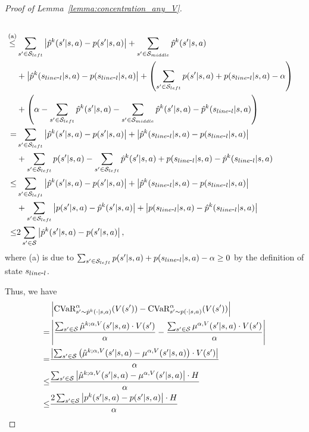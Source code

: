 \begin{proof}[Proof of Lemma~\ref{lemma:concentration_any_V}]
\begin{align}
		\nonumber\\
		\overset{\textup{(a)}}{\leq} & \sum_{s' \in \mathcal{S}_{left}} \left| \hat{p}^k(s'|s,a)-p(s'|s,a) \right| + \sum_{s' \in \mathcal{S}_{middle}} \hat{p}^{k}(s'|s,a) \nonumber\\& + \left| \hat{p}^{k}(s_{line \mbox{-} l}|s,a) - p(s_{line \mbox{-} l}|s,a) \right| + \left( \sum_{s' \in \mathcal{S}_{left}} p(s'|s,a) + p(s_{line \mbox{-} l}|s,a) - \alpha \right) \nonumber\\& + \left( \alpha-\sum_{s' \in \mathcal{S}_{left}} \hat{p}^{k}(s'|s,a) - \sum_{s' \in \mathcal{S}_{middle}} \hat{p}^{k}(s'|s,a) - \hat{p}^{k}(s_{line \mbox{-} l}|s,a) \right)
		\nonumber\\
		= & \sum_{s' \in \mathcal{S}_{left}} \left| \hat{p}^k(s'|s,a)-p(s'|s,a) \right| + \left| \hat{p}^{k}(s_{line \mbox{-} l}|s,a) - p(s_{line \mbox{-} l}|s,a) \right| \nonumber\\& + \sum_{s' \in \mathcal{S}_{left}} p(s'|s,a) - \sum_{s' \in \mathcal{S}_{left}} \hat{p}^{k}(s'|s,a) + p(s_{line \mbox{-} l}|s,a) - \hat{p}^{k}(s_{line \mbox{-} l}|s,a)
		\nonumber\\
		\leq & \sum_{s' \in \mathcal{S}_{left}} \left| \hat{p}^k(s'|s,a)-p(s'|s,a) \right| + \left| \hat{p}^{k}(s_{line \mbox{-} l}|s,a) - p(s_{line \mbox{-} l}|s,a) \right| \nonumber\\& + \sum_{s' \in \mathcal{S}_{left}} \left| p(s'|s,a) - \hat{p}^{k}(s'|s,a) \right| + \left| p(s_{line \mbox{-} l}|s,a) - \hat{p}^{k}(s_{line \mbox{-} l}|s,a) \right|
		\nonumber\\
		\leq & 2 \sum_{s' \in \mathcal{S}} \left| \hat{p}^k(s'|s,a)-p(s'|s,a) \right| , \label{eq:bound_mu_by_2p}
	\end{align}
	where (a) is due to $\sum_{s' \in \mathcal{S}_{left}} p(s'|s,a) + p(s_{line \mbox{-} l}|s,a) - \alpha \geq 0$ by the definition of state $s_{line \mbox{-} l}$.
	
	Thus, we have
	\begin{align}
		& \left| \textup{CVaR}^{\alpha}_{s' \sim \hat{p}^k(\cdot|s,a)}(V(s')) - \textup{CVaR}^{\alpha}_{s' \sim p(\cdot|s,a)}(V(s'))  \right|
		\nonumber\\
		= & \left| \frac{ \sum_{s' \in \mathcal{S}} \hat{\mu}^{k;\alpha,V}(s'|s,a) \cdot V(s') }{\alpha} - \frac{ \sum_{s' \in \mathcal{S}} \mu^{\alpha,V}(s'|s,a) \cdot V(s') }{\alpha} \right|
		\nonumber\\
		= & \frac{ \left| \sum_{s' \in \mathcal{S}} \left( \hat{\mu}^{k;\alpha,V}(s'|s,a)-\mu^{\alpha,V}(s'|s,a) \right) \cdot V(s') \right| }{\alpha}
		\nonumber\\
		\leq & \frac{\sum_{s' \in \mathcal{S}} \left| \hat{\mu}^{k;\alpha,V}(s'|s,a)-\mu^{\alpha,V}(s'|s,a) \right| \cdot H}{\alpha}
		\nonumber\\
		\leq & \frac{2 \sum_{s' \in \mathcal{S}} \left| p^{k}(s'|s,a)-p(s'|s,a) \right| \cdot H}{\alpha} \label{eq:con_for_any_V_ell_1}
	\end{align}
	

\end{proof}
